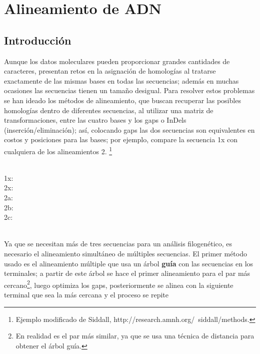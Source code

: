 \chapter{Alineamiento de ADN}
\section*{Introducci\'on}
\label{ch:alinear}

Aunque los datos moleculares pueden proporcionar grandes cantidades de caracteres, presentan retos 
en la asignaci\'on de homolog\'ias al tratarse exactamente de las mismas bases en todas las secuencias; adem\'as 
en muchas ocasiones las secuencias tienen un tama\~no desigual. 
Para resolver estos problemas se han ideado los m\'etodos de alineamiento, que buscan recuperar las posibles homolog\'ias 
dentro de diferentes secuencias, al utilizar una matriz de transformaciones, entre las cuatro bases y los gaps o 
InDels (inserci\'on/eliminaci\'on); as\'i, colocando gaps las dos secuencias son equivalentes en costos y  posiciones
 para las bases; por ejemplo, compare la secuencia 1x con cualquiera de los alineamientos 2.
\footnote{Ejemplo modificado de Siddall, http://research.amnh.org/~siddall/methods.}\\
\\
\begin{small}
1x: \\
2x: \\
2a: \\
2b: \\
2c: \\
\end{small}
\\
Ya que se necesitan m\'as de tres secuencias para un an\'alisis filogen\'etico, es necesario el alineamiento simult\'aneo de 
m\'ultiples secuencias. El primer m\'etodo usado es el alineamiento m\'ultiple que usa un \'arbol \textbf{gu\'ia} con las 
secuencias en los terminales; a partir de este \'arbol se hace el primer alineamiento para el par m\'as 
cercano\footnote{En realidad es el par m\'as similar, ya que se usa una t\'ecnica de distancia para obtener el \'arbol gu\'ia.}, 
luego optimiza los gaps, posteriormente se alinea con la siguiente terminal que sea la m\'as cercana y el proceso se repite 

